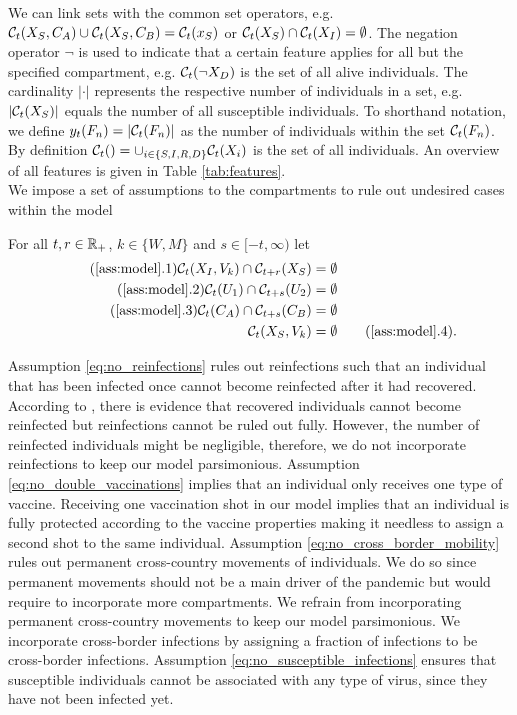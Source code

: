 We can link sets with the common set operators, e.g. $\mathcal{C}_t(X_S, C_A) \cup \mathcal{C}_t(X_S, C_B) = \mathcal{C}_t(x_S)$ or $\mathcal{C}_t(X_S) \cap \mathcal{C}_t(X_I) = \emptyset$. The negation operator $\neg$ is used to indicate that a certain feature applies for all but the specified compartment, e.g. $\mathcal{C}_t(\neg X_D)$ is the set of all alive individuals. The cardinality $|\cdot|$ represents the respective number of individuals in a set, e.g. $|\mathcal{C}_t(X_S)|$ equals the number of all susceptible individuals. To shorthand notation, we define $y_t(F_n) = |\mathcal{C}_t(F_n)|$ as the number of individuals within the set $\mathcal{C}_t(F_n)$. By definition $\mathcal{C}_t() = \cup_{i \in \{ S, I, R,D\}} \mathcal{C}_t(X_i)$ is the set of all individuals. An overview of all features is given in Table \ref{tab:features}. \\


We impose a set of assumptions to the compartments to rule out undesired cases within the model 
\begin{assumption}\label{ass:model}
For all $t,r \in \mathbb{R}_+$, $k \in \{W,M\}$ and $s \in [-t, \infty)$ let
\begin{align*}
\tag{\ref{ass:model}.1} 
\label{eq:no_reinfections}
\set(X_I, V_k) \cap \mathcal{C}_{t+r}(X_S) &= \emptyset \\
\tag{\ref{ass:model}.2} 
\label{eq:no_double_vaccinations}
\set(U_1) \cap \mathcal{C}_{t+s}(U_2) &= \emptyset \\
\tag{\ref{ass:model}.3} 
\label{eq:no_cross_border_mobility}
\set(C_A) \cap \mathcal{C}_{t+s}(C_B) &= \emptyset  \\
\set(X_S, V_k) &= \emptyset
\tag{\ref{ass:model}.4}.
\label{eq:no_susceptible_infections}
\end{align*}
\end{assumption}
\noindent Assumption \ref{eq:no_reinfections} rules out reinfections such that an individual that has been infected once cannot become reinfected after it had recovered. According to \cite{Roy.2020}, there is evidence that recovered individuals cannot become reinfected but reinfections cannot be ruled out fully. However, the number of reinfected individuals might be negligible, therefore, we do not incorporate reinfections to keep our model parsimonious. Assumption \ref{eq:no_double_vaccinations} implies that an individual only receives one type of vaccine. Receiving one vaccination shot in our model implies that an individual is fully protected according to the vaccine properties making it needless to assign a second shot to the same individual. Assumption \ref{eq:no_cross_border_mobility} rules out permanent cross-country movements of individuals. We do so since  permanent movements should not be a main driver of the pandemic but would require to incorporate more compartments. We refrain from incorporating permanent cross-country movements to keep our model parsimonious. We incorporate cross-border infections by assigning a fraction of infections to be cross-border infections.
Assumption \ref{eq:no_susceptible_infections} ensures that susceptible individuals cannot be associated with any type of virus, since they have not been infected yet.

